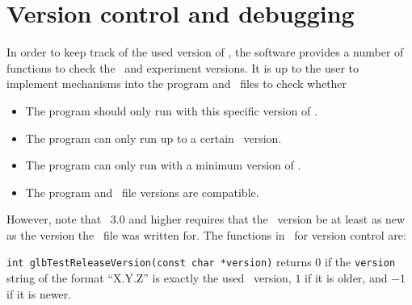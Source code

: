 \section{Version control and debugging}
\label{sec:versioning}

In order to keep track of the used version of \GLOBES , the software
provides a number of functions to check the \GLOBES\ and experiment
versions. It is up to the user to implement mechanisms into the
program and \AEDL\ files to check whether
\begin{itemize}
\item
 The program should only run with this specific version of \GLOBES .
\item
 The program can only run up to a certain \GLOBES\ version.
\item
 The program can only run with a minimum version of \GLOBES .
\item
 The program and \AEDL\ file versions are compatible.
\end{itemize}
However, note that \GLOBES ~3.0 and higher requires that the \GLOBES\ version be at least as new as the
version the \AEDL\ file was written for.
%
The functions in \GLOBES\ for version control are:
\begin{function}
{\tt int glbTestReleaseVersion(const char *version)} returns $0$ if
the {\tt version} string of the format ``X.Y.Z'' is exactly the
used \GLOBES\ version, $1$ if it is older, and $-1$ if it is newer. 
\end{function}

